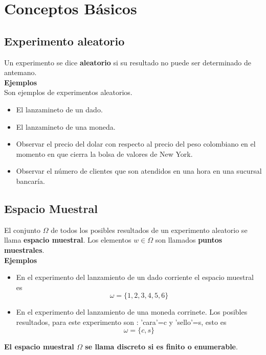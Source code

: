 \documentclass{book}
\begin{document}
    \chapter{Conceptos Básicos}
    \section{Experimento aleatorio}
    Un experimento se dice \textbf{aleatorio} si su resultado no puede ser determinado de antemano.
    \\ 
    \textbf{Ejemplos} \\ 
    Son ejemplos de experimentos aleatorios. 
    \begin{itemize}
        \item El lanzamineto de un dado.
        \item El lanzamineto de una moneda.
        \item Observar el precio del dolar con respecto al precio del peso colombiano en el momento en que cierra la bolsa de valores de 
        New York.
        \item Observar el número de clientes que son atendidos en una hora en una sucursal bancaría.
    \end{itemize}
    \section{Espacio Muestral}
    El conjunto $\Omega$ de todos los posibles resultados de un experimento aleatorio se llama \textbf{espacio muestral}.
    Los elementos $w \in \Omega$  son llamados \textbf{puntos muestrales}. \\ 
    \textbf{Ejemplos} \\ 
    \begin{itemize}
        \item En el experimento del lanzamiento de un dado corriente el espacio muestral es 
            \begin{equation*}
                \omega = \{ 1, 2 ,3 ,4 ,5 ,6\}
            \end{equation*}
        \item En el experimento del lanzamiento de una moneda corrinete. Los posibles resultados, para este 
        experimento son : 'cara'=c y 'sello'=s, esto es 
            \begin{equation*}
                \omega = \{ c,s\}
            \end{equation*}
    \end{itemize}
    \textbf{El espacio muestral $\Omega$ se llama discreto si es finito o enumerable}.
\end{document}
